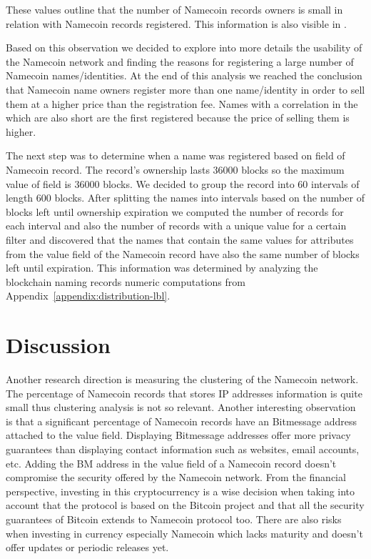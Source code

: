 These values outline that the number of Namecoin records owners is small in relation with Namecoin records registered. This information is also visible in .


Based on this observation we decided to explore into more details the usability of the Namecoin network and finding the reasons for registering a large number of Namecoin names/identities. At the end of this analysis we reached the conclusion that Namecoin name owners register more than one name/identity in order to sell them at a higher price than the registration fee. Names with a correlation in the  which are also short are the first registered because the price of selling them is higher.

The next step was to determine when a name was registered based on  field of Namecoin record. The record's ownership lasts 36000 blocks so the maximum value of  field is 36000 blocks. We decided to group the record into 60 intervals of length 600 blocks. After splitting the names into intervals based on the number of blocks left until ownership expiration we computed the number of records for each interval and also the number of records with a unique value for a certain filter and discovered that the names that contain the same values for attributes from the value field of the Namecoin record have also the same number of blocks left until expiration. This information was determined by analyzing the blockchain naming records numeric computations from Appendix~\ref{appendix:distribution-lbl}. 

 
\section{Discussion}
\label{sec:discussion}
Another research direction is measuring the clustering of the Namecoin network.
The percentage of Namecoin records that stores IP addresses information is quite small thus clustering analysis is not so relevant. Another interesting observation is that a significant percentage of Namecoin records have an Bitmessage address~\cite{bitmessage} attached to the value field. 
Displaying Bitmessage addresses offer more privacy guarantees than displaying contact information such as websites, email accounts, etc. Adding the BM address in the value field of a Namecoin record doesn't compromise the security offered by the Namecoin network. 
From the financial perspective, investing in this cryptocurrency is a wise decision when taking into account that the protocol is based on the Bitcoin project and that all the security guarantees of Bitcoin extends to Namecoin protocol too. There are also risks when investing in  currency especially Namecoin which lacks maturity and doesn't offer updates or periodic releases yet.